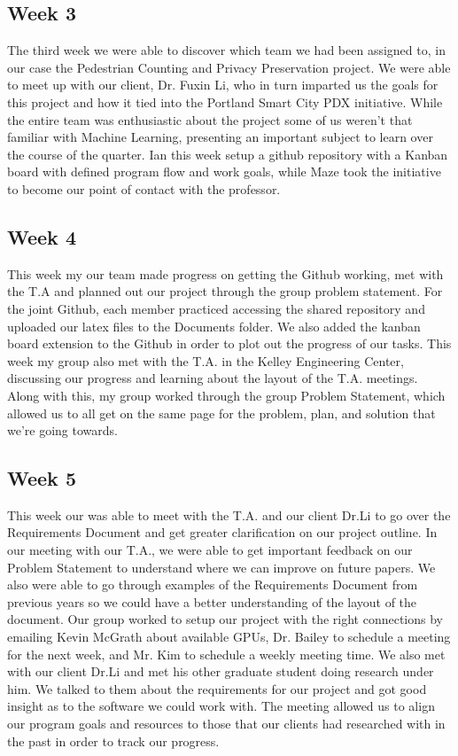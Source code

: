 \documentclass[onecolumn, draftclsnofoot,10pt, compsoc]{IEEEtran}
\begin{document}
\subsection{Week 3}
The third week we were able to discover which team we had been assigned to, in our case the Pedestrian Counting and Privacy Preservation project. We were able to meet up with our client, Dr. Fuxin Li, who in turn imparted us the goals for this project and how it tied into the Portland Smart City PDX initiative. While the entire team was enthusiastic about the project some of us weren’t that familiar with Machine Learning, presenting an important subject to learn over the course of the quarter. Ian this week setup a github repository with a Kanban board with defined program flow and work goals, while Maze took the initiative to become our point of contact with the professor.

\subsection{Week 4}
This week my our team made progress on getting the Github working, met with the T.A and planned out our project through the group problem statement. For the joint Github, each member practiced accessing the shared repository and uploaded our latex files to the Documents folder. We also added the kanban board extension to the Github in order to plot out the progress of our tasks. This week my group also met with the T.A. in the Kelley Engineering Center, discussing our progress and learning about the layout of the T.A. meetings. Along with this, my group worked through the group Problem Statement, which allowed us to all get on the same page for the problem, plan, and solution that we’re going towards. 

\subsection{Week 5}
This week our was able to meet with the T.A. and our client Dr.Li to go over the Requirements Document and get greater clarification on our project outline. In our meeting with our T.A., we were able to get important feedback on our Problem Statement to understand where we can improve on future papers. We also were able to go through examples of the Requirements Document from previous years so we could have a better understanding of the layout of the document. Our group worked to setup our project with the right connections by emailing Kevin McGrath about available GPUs, Dr. Bailey to schedule a meeting for the next week, and Mr. Kim to schedule a weekly meeting time. We also met with our client Dr.Li and met his other graduate student doing research under him. We talked to them about the requirements for our project and got good insight as to the software we could work with. The meeting allowed us to align our program goals and resources to those that our clients had researched with in the past in order to track our progress.
\end{document}
